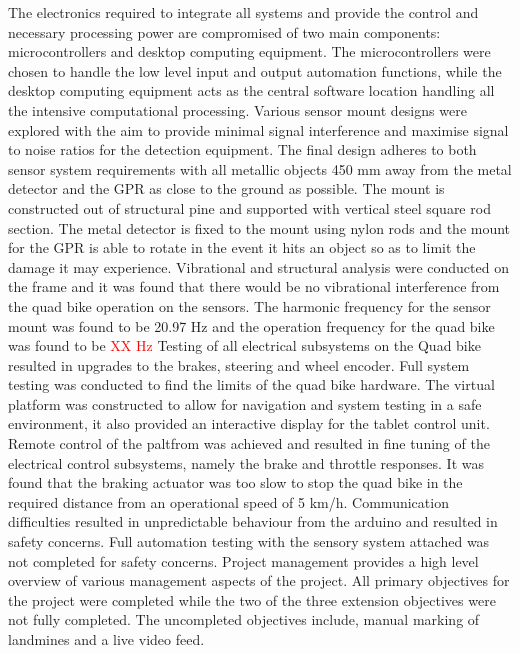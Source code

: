 \documentclass[main.tex]{subfiles}
\begin{document}
{The electronics required to integrate all systems and provide the control and necessary processing power are compromised of two main components: microcontrollers and desktop computing equipment. 
The microcontrollers were chosen to handle the low level input and output automation functions, while the desktop computing equipment acts as the central software location handling all the intensive computational processing. 
Various sensor mount designs were explored with the aim to provide minimal signal interference and maximise signal to noise ratios for the detection equipment. 
The final design adheres to both sensor system requirements with all metallic objects 450 mm away from the metal detector and the GPR as close to the ground as possible. 
The mount is constructed out of structural pine and supported with vertical steel square rod section. The metal detector is fixed to the mount using nylon rods and the mount for the GPR is able to rotate in the event it hits an object so as to limit the damage it may experience. Vibrational and structural analysis were conducted on the frame and it was found that there would be no vibrational interference from the quad bike operation on the sensors. The harmonic frequency for the sensor mount was found to be 20.97 Hz and the operation frequency for the quad bike was found to be \textcolor{red}{XX Hz} 
Testing of all electrical subsystems on the Quad bike resulted in upgrades to the brakes, steering and wheel encoder. Full system testing was conducted to find the limits of the quad bike hardware. The virtual platform was constructed to allow for navigation and system testing in a safe environment, it also provided an interactive display for the tablet control unit. Remote control of the paltfrom was achieved and resulted in fine tuning of the electrical control subsystems, namely the brake and throttle responses. It was found that the braking actuator was too slow to stop the quad bike in the required distance from an operational speed of 5 km/h. Communication difficulties resulted in unpredictable behaviour from the arduino and resulted in safety concerns. Full automation testing with the sensory system attached was not completed for safety concerns. 
Project management provides a high level overview of various management aspects of the project. All primary objectives for the project were completed while the two of the three extension objectives were not fully completed. The uncompleted objectives include, manual marking of landmines and a live video feed.}
\end{document}
